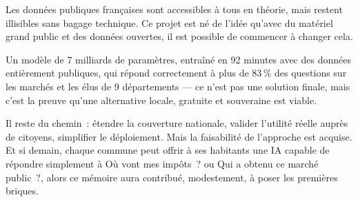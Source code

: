 Les données publiques françaises sont accessibles à tous en théorie, mais restent illisibles sans bagage technique. Ce projet est né de l'idée qu'avec du matériel grand public et des données ouvertes, il est possible de commencer à changer cela.

Un modèle de 7 milliards de paramètres, entraîné en 92 minutes avec des données entièrement publiques, qui répond correctement à plus de 83\,\% des questions sur les marchés et les élus de 9 départements --- ce n'est pas une solution finale, mais c'est la preuve qu'une alternative locale, gratuite et souveraine est viable.

Il reste du chemin~: étendre la couverture nationale, valider l'utilité réelle auprès de citoyens, simplifier le déploiement. Mais la faisabilité de l'approche est acquise. Et si demain, chaque commune peut offrir à ses habitants une IA capable de répondre simplement à \og{}Où vont mes impôts~?\fg{} ou \og{}Qui a obtenu ce marché public~?\fg{}, alors ce mémoire aura contribué, modestement, à poser les premières briques.
